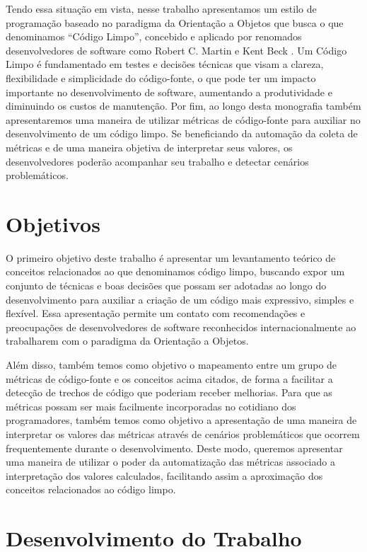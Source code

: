 Tendo essa situação em vista, nesse trabalho apresentamos um estilo de programação baseado
no paradigma da Orientação a Objetos que busca o que denominamos ``Código Limpo'', concebido e aplicado por renomados desenvolvedores de software
como Robert C. Martin \citep{Martin2008} e Kent Beck \citep{Beck2007}.
%
Um Código Limpo é fundamentado em testes e decisões técnicas que visam a clareza, flexibilidade
e simplicidade do código-fonte, o que pode ter um impacto importante no desenvolvimento
de software, aumentando a produtividade e diminuindo os custos de manutenção.
%
Por fim, ao longo desta monografia também apresentaremos uma maneira de utilizar métricas de código-fonte para auxiliar no desenvolvimento
de um código limpo. Se beneficiando da automação da coleta de métricas e de uma maneira objetiva de interpretar seus valores,
os desenvolvedores poderão acompanhar seu trabalho e detectar cenários problemáticos.

\section{Objetivos}
\label{sec:objetivo}

O primeiro objetivo deste trabalho é apresentar um levantamento teórico de conceitos relacionados ao que denominamos
código limpo, buscando expor um conjunto de técnicas e boas decisões que possam ser adotadas ao longo do
desenvolvimento para auxiliar a criação de um código mais expressivo, simples e flexível. Essa apresentação permite um
contato com recomendações e preocupações de desenvolvedores de software reconhecidos internacionalmente ao trabalharem com
o paradigma da Orientação a Objetos.

Além disso, também temos como objetivo o mapeamento entre um grupo de métricas de código-fonte e os conceitos acima 
citados, de forma a facilitar a detecção de trechos de código que poderiam receber melhorias. Para que as
métricas possam ser mais facilmente incorporadas no cotidiano dos programadores, também temos como objetivo a apresentação
de uma maneira de interpretar os valores das métricas através de cenários problemáticos que ocorrem frequentemente durante
o desenvolvimento.
%
Deste modo, queremos apresentar uma maneira de utilizar o poder da automatização das métricas associado a interpretação dos valores calculados,
facilitando assim a aproximação dos conceitos relacionados ao código limpo.

\section{Desenvolvimento do Trabalho}
\label{sec:desenvolvimento}

